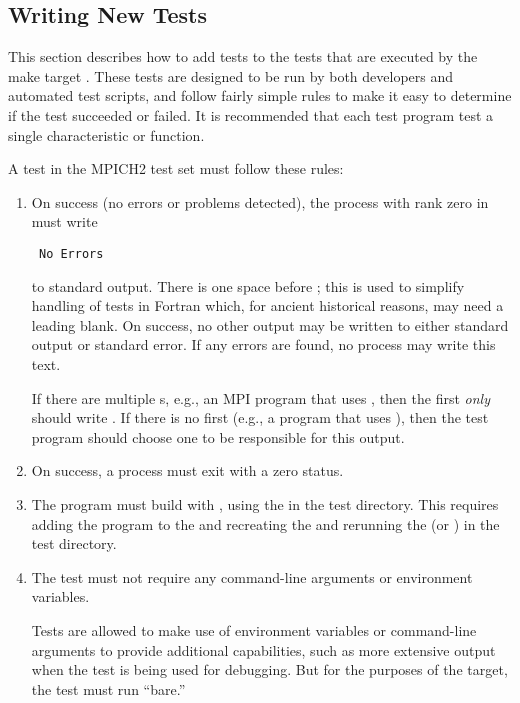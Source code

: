 \subsection{Writing New Tests}
\label{sec:new-tests}
This section describes how to add tests to the tests that are executed
by the make target .  These tests are designed to be run
by both developers and automated test scripts, and follow fairly
simple rules to make it easy to determine if the test succeeded or
failed.  It is recommended that each test program test a single
characteristic or function.

A test in the MPICH2 test set must follow these rules:
\begin{enumerate}
\item On success (no errors or problems detected), the process with
rank zero in  must write
\begin{verbatim}
 No Errors
\end{verbatim}
to standard output.  
There is one space before ; this is used to simplify handling
of tests in Fortran which, for ancient historical reasons, may need a
leading blank.  On success, no other output may be written to either
standard output or standard error.
If any errors are found, no process may write
this text.

If there are multiple s, e.g., an MPI program
that uses , then the first 
\emph{only} should write .  If there is no first
 (e.g., a program that uses
), then the test program should choose one
 to be responsible for this output.

\item On success, a process must exit with a zero status.

\item The program must build with , using the
 in the test directory.  This requires adding the
program to the  and recreating the
 and rerunning the  (or
) in the test directory.

\item The test must not require any command-line arguments or
environment variables.

Tests are allowed to make use of environment
variables or command-line arguments to provide additional
capabilities, such as more extensive output when the test is being
used for debugging.  But for the purposes of the 
target, the test must run ``bare.''


\end{enumerate}
